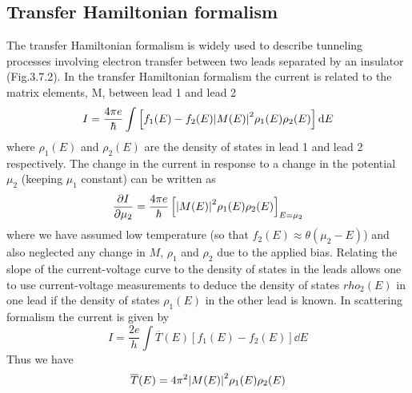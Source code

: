 \documentclass[11pt,a4paper]{book}
\theoremstyle{plain}
\theoremstyle{definition}
\theoremstyle{remark}
\begin{document}
\subsection{Transfer Hamiltonian formalism}
The transfer Hamiltonian formalism is widely used to describe tunneling processes involving electron transfer between two leads separated by an insulator (Fig.3.7.2). In the transfer Hamiltonian formalism the current is related to the matrix elements, M, between lead 1 and lead 2
\begin{equation}
    I = \frac{4 \pi e}{\hbar} \int \left[ f_1(E) - f_2(E) \abs{M(E)}^2 \rho_1(E)\rho_2(E) \right] \dd E
\end{equation}
where $\rho_1(E)$ and $\rho_2(E)$ are the density of states in lead 1 and lead 2 respectively. The change in the current in response to a change in the potential $\mu_2$ (keeping $\mu_1$ constant) can be written as 
\begin{equation}
    \pdv{I}{\mu_2} = \frac{4 \pi e}{\hbar} \left[ \abs{M(E)}^2 \rho_1(E)\rho_2(E) \right]_{E = \mu_2}
\end{equation}
where we have assumed low temperature (so that $f_2(E)\approx \theta(\mu_2-E)$) and also neglected any change in $M$, $\rho_1$ and $\rho_2$ due to the applied bias. Relating the slope of the current-voltage curve to the density of states in the leads allows one to use current-voltage measurements to deduce the density of states $rho_2(E)$ in one lead if the density of states $\rho_1(E)$ in the other lead is known. In scattering formalism the current is given by
\begin{equation}
    I = \frac{2 e}{h} \int \overline{T}(E) \left[f_1(E) - f_2(E) \right] \dd E
\end{equation}
Thus we have
\begin{equation}
    \overline{T}(E) = 4 \pi^2 \abs{M(E)}^2 \rho_1(E) \rho_2(E)
\end{equation}
\end{document}
